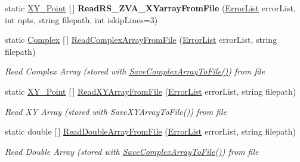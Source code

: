 \begin{DoxyCompactItemize}
\item 
\mbox{\label{class_c_s_i_1_1_library_1_1_plotting_lib_1_1_plot2_d_aa0092b18d36582318cadd2dfb2024ed9}} 
static \mbox{\hyperlink{struct_c_s_i_1_1_library_1_1_data_types_1_1_x_y___point}{X\+Y\+\_\+\+Point}} \mbox{[}$\,$\mbox{]} {\bfseries Read\+R\+S\+\_\+\+Z\+V\+A\+\_\+\+X\+Yarray\+From\+File} (\mbox{\hyperlink{class_c_s_i_1_1_library_1_1_errors_1_1_error_list}{Error\+List}} error\+List, int npts, string filepath, int iskip\+Lines=3)
\item 
static \mbox{\hyperlink{struct_c_s_i_1_1_library_1_1_data_types_1_1_complex}{Complex}} \mbox{[}$\,$\mbox{]} \mbox{\hyperlink{class_c_s_i_1_1_library_1_1_plotting_lib_1_1_plot2_d_a32b1f7659fee9593d8c22eec9ef0421d}{Read\+Complex\+Array\+From\+File}} (\mbox{\hyperlink{class_c_s_i_1_1_library_1_1_errors_1_1_error_list}{Error\+List}} error\+List, string filepath)
\begin{DoxyCompactList}\small\item\em Read Complex Array (stored with \mbox{\hyperlink{class_c_s_i_1_1_library_1_1_plotting_lib_1_1_plot2_d_a0959acd193403a2feaaad7940884ad12}{Save\+Complex\+Array\+To\+File()}}) from file \end{DoxyCompactList}\item 
static \mbox{\hyperlink{struct_c_s_i_1_1_library_1_1_data_types_1_1_x_y___point}{X\+Y\+\_\+\+Point}} \mbox{[}$\,$\mbox{]} \mbox{\hyperlink{class_c_s_i_1_1_library_1_1_plotting_lib_1_1_plot2_d_ae13604c7f537fce584a79105c415fef2}{Read\+X\+Y\+Array\+From\+File}} (\mbox{\hyperlink{class_c_s_i_1_1_library_1_1_errors_1_1_error_list}{Error\+List}} error\+List, string filepath)
\begin{DoxyCompactList}\small\item\em Read XY Array (stored with Save\+X\+Y\+Array\+To\+File()) from file \end{DoxyCompactList}\item 
static double \mbox{[}$\,$\mbox{]} \mbox{\hyperlink{class_c_s_i_1_1_library_1_1_plotting_lib_1_1_plot2_d_a5384d3f88757fb6a8b297a894016609b}{Read\+Double\+Array\+From\+File}} (\mbox{\hyperlink{class_c_s_i_1_1_library_1_1_errors_1_1_error_list}{Error\+List}} error\+List, string filepath)
\begin{DoxyCompactList}\small\item\em Read Double Array (stored with \mbox{\hyperlink{class_c_s_i_1_1_library_1_1_plotting_lib_1_1_plot2_d_a0959acd193403a2feaaad7940884ad12}{Save\+Complex\+Array\+To\+File()}}) from file \end{DoxyCompactList}\item 

\end{DoxyCompactItemize}
